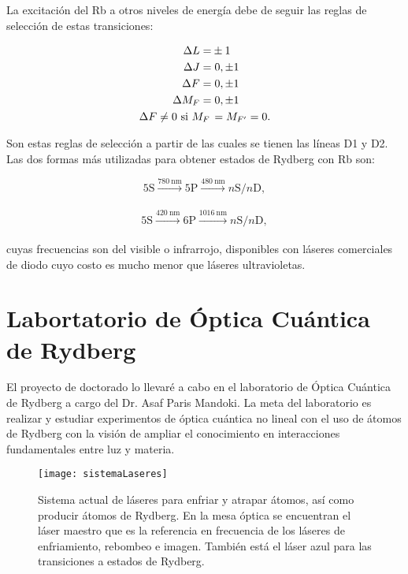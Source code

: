 \p La excitación del Rb a otros niveles de energía debe de seguir las reglas de selección de estas transiciones:

 \begin{equation}
\label{ec:reglasSeleccion}
\begin{split}
\Delta L= & \pm1\\
\Delta J= & \hspace{1mm}0,\pm1\\
\Delta F= & \hspace{1mm}0,\pm1\\
\Delta M_{F}= & \hspace{1mm}0,\pm1\\
\Delta F\neq0\text{ si }M_{F}\hspace{0.5mm} & =M_{F'}=0.
\end{split}
\end{equation}

Son estas reglas de selección a partir de las cuales se tienen las líneas D1 y D2. Las dos formas más utilizadas para obtener estados de Rydberg con Rb son:

\begin{equation}
\label{ec:rydbergRb1}
5\mathrm{S}\xrightarrow[]{\SI{780}{\nano\meter}}5\mathrm{P}\xrightarrow[]{\SI{480}{\nano\meter}}n\mathrm{S}/n\mathrm{D},
\end{equation}

\begin{equation}
\label{ec:rydbergRb2}
5\mathrm{S}\xrightarrow[]{\SI{420}{\nano\meter}}6\mathrm{P}\xrightarrow[]{\SI{1016}{\nano\meter}}n\mathrm{S}/n\mathrm{D},
\end{equation}

cuyas frecuencias son del visible o infrarrojo, disponibles con láseres comerciales de diodo cuyo costo es mucho menor que láseres ultravioletas.

\section{\label{sec:laboratorioOCR}Labortatorio de Óptica Cuántica de Rydberg}

El proyecto de doctorado lo llevaré a cabo en el laboratorio de Óptica Cuántica de Rydberg a cargo del Dr. Asaf Paris Mandoki. La meta del laboratorio es realizar y estudiar experimentos de óptica cuántica no lineal con el uso de átomos de Rydberg con la visión de ampliar el conocimiento en interacciones fundamentales entre luz y materia.

\begin{figure}[H]
\centering
\begin{minipage}{0.8\textwidth}
\centering
\texttt{[image: sistemaLaseres]}
\caption{\label{fig:sistemaLaseres}Sistema actual de láseres para enfriar y atrapar átomos, así como producir átomos de Rydberg. En la mesa óptica se encuentran el láser maestro que es la referencia en frecuencia de los láseres de enfriamiento, rebombeo e imagen. También está el láser azul para las transiciones a estados de Rydberg.}
\end{minipage}
\end{figure}

